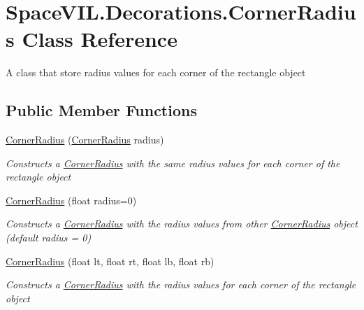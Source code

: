 \hypertarget{class_space_v_i_l_1_1_decorations_1_1_corner_radius}{}\section{Space\+V\+I\+L.\+Decorations.\+Corner\+Radius Class Reference}
\label{class_space_v_i_l_1_1_decorations_1_1_corner_radius}


A class that store radius values for each corner of the rectangle object  


\subsection*{Public Member Functions}
\begin{DoxyCompactItemize}
\item 
\mbox{\hyperlink{class_space_v_i_l_1_1_decorations_1_1_corner_radius_ada9a5a6f3e04d10e5ea65ffa6692b61c}{Corner\+Radius}} (\mbox{\hyperlink{class_space_v_i_l_1_1_decorations_1_1_corner_radius}{Corner\+Radius}} radius)
\begin{DoxyCompactList}\small\item\em Constructs a \mbox{\hyperlink{class_space_v_i_l_1_1_decorations_1_1_corner_radius}{Corner\+Radius}} with the same radius values for each corner of the rectangle object \end{DoxyCompactList}\item 
\mbox{\hyperlink{class_space_v_i_l_1_1_decorations_1_1_corner_radius_a77ef3851682dba201957ebd8c4ae1e93}{Corner\+Radius}} (float radius=0)
\begin{DoxyCompactList}\small\item\em Constructs a \mbox{\hyperlink{class_space_v_i_l_1_1_decorations_1_1_corner_radius}{Corner\+Radius}} with the radius values from other \mbox{\hyperlink{class_space_v_i_l_1_1_decorations_1_1_corner_radius}{Corner\+Radius}} object (default radius = 0) \end{DoxyCompactList}\item 
\mbox{\hyperlink{class_space_v_i_l_1_1_decorations_1_1_corner_radius_a486555a2befbaf3cbe29039669e95b99}{Corner\+Radius}} (float lt, float rt, float lb, float rb)
\begin{DoxyCompactList}\small\item\em Constructs a \mbox{\hyperlink{class_space_v_i_l_1_1_decorations_1_1_corner_radius}{Corner\+Radius}} with the radius values for each corner of the rectangle object \end{DoxyCompactList}\end{DoxyCompactItemize}
